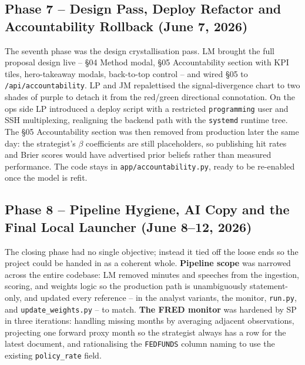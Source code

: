 \subsection{Phase 7 -- Design Pass, Deploy Refactor and Accountability Rollback (June 7, 2026)}
The seventh phase was the design crystallisation pass. LM brought the full proposal design live -- §04 Method modal, §05 Accountability section with KPI tiles, hero-takeaway modals, back-to-top control -- and wired §05 to \texttt{/api/accountability}. LP and JM repalettised the signal-divergence chart to two shades of purple to detach it from the red/green directional connotation. On the ops side LP introduced a deploy script with a restricted \texttt{programming} user and SSH multiplexing, realigning the backend path with the \texttt{systemd} runtime tree. The §05 Accountability section was then removed from production later the same day: the strategist's \(\beta\) coefficients are still placeholders, so publishing hit rates and Brier scores would have advertised prior beliefs rather than measured performance. The code stays in \texttt{app/accountability.py}, ready to be re-enabled once the model is refit.

\subsection{Phase 8 -- Pipeline Hygiene, AI Copy and the Final Local Launcher (June 8--12, 2026)}
The closing phase had no single objective; instead it tied off the loose ends so the project could be handed in as a coherent whole. \textbf{Pipeline scope} was narrowed across the entire codebase: LM removed minutes and speeches from the ingestion, scoring, and weights logic so the production path is unambiguously statement-only, and updated every reference -- in the analyst variants, the monitor, \texttt{run.py}, and \texttt{update\_weights.py} -- to match. \textbf{The FRED monitor} was hardened by SP in three iterations: handling missing months by averaging adjacent observations, projecting one forward proxy month so the strategist always has a row for the latest document, and rationalising the \texttt{FEDFUNDS} column naming to use the existing \texttt{policy\_rate} field.


